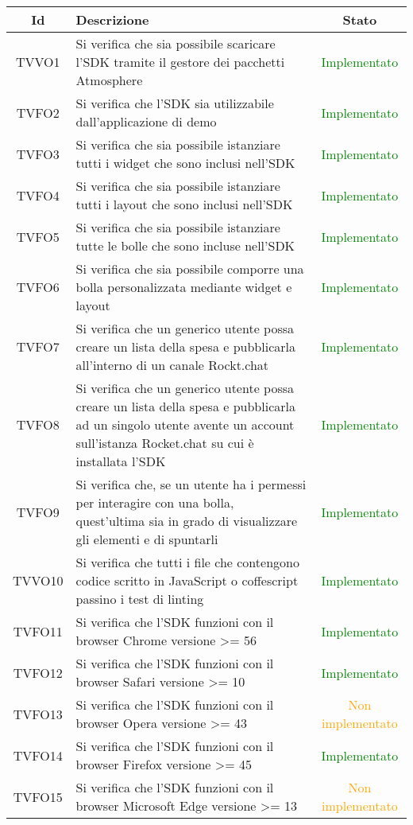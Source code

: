 \begin{center}
	\begin{longtable}{|c|>{\centering}m{10cm}|c|}\hline
		Id & Descrizione & Stato\\ \hline
		TVVO1 & Si verifica che sia possibile scaricare l'SDK tramite il gestore dei pacchetti Atmosphere & \textcolor{Green}{Implementato}\\ \hline
		TVFO2 & Si verifica che l'SDK sia utilizzabile dall'applicazione di demo & \textcolor{Green}{Implementato}\\ \hline
		TVFO3 & Si verifica che sia possibile istanziare tutti i widget che sono inclusi nell'SDK & \textcolor{Green}{Implementato}\\ \hline
		TVFO4 & Si verifica che sia possibile istanziare tutti i layout che sono inclusi nell'SDK & \textcolor{Green}{Implementato}\\ \hline
		TVFO5 & Si verifica che sia possibile istanziare tutte le bolle che sono incluse nell'SDK & \textcolor{Green}{Implementato}\\ \hline
		TVFO6 & Si verifica che sia possibile comporre una bolla personalizzata mediante widget e layout & \textcolor{Green}{Implementato}\\ \hline
		TVFO7 & Si verifica che un generico utente possa creare un lista della spesa e pubblicarla all'interno di un canale Rockt.chat & \textcolor{Green}{Implementato}\\ \hline
		TVFO8 & Si verifica che un generico utente possa creare un lista della spesa e pubblicarla ad un singolo utente avente un account sull'istanza Rocket.chat su cui è installata l'SDK & \textcolor{Green}{Implementato}\\ \hline
		TVFO9 & Si verifica che, se un utente ha i permessi per interagire con una bolla, quest'ultima sia in grado di visualizzare gli elementi e di spuntarli & \textcolor{Green}{Implementato}\\ \hline
		TVVO10 & Si verifica che tutti i file che contengono codice scritto in JavaScript o coffescript passino i test di linting & \textcolor{Green}{Implementato}\\ \hline
		TVFO11 & Si verifica che l'SDK funzioni con il browser Chrome versione >= 56 & \textcolor{Green}{Implementato}\\ \hline
		TVFO12 & Si verifica che l'SDK funzioni con il browser Safari versione >= 10 & \textcolor{Green}{Implementato}\\ \hline
		TVFO13 & Si verifica che l'SDK funzioni con il browser Opera versione >= 43 & \textcolor{Orange}{Non implementato}\\ \hline
		TVFO14 & Si verifica che l'SDK funzioni con il browser Firefox versione >= 45 & \textcolor{Green}{Implementato}\\ \hline
		TVFO15 & Si verifica che l'SDK funzioni con il browser Microsoft Edge versione >= 13 & \textcolor{Orange}{Non implementato}\\ \hline
	\end{longtable}
\end{center}

